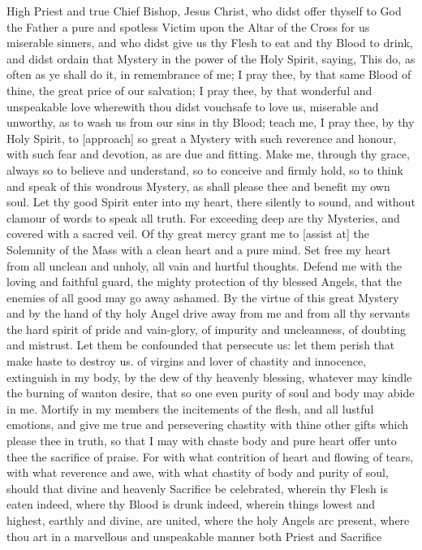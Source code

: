  High Priest and true Chief Bishop, Jesus Christ, who didst offer thyself to God the Father a pure and spotless Victim upon the Altar of the Cross for us miserable sinners, and who didst give us thy Flesh to eat and thy Blood to drink, and didst ordain that Mystery in the power of the Holy Spirit, saying, This do, as often as ye shall do it, in remembrance of me; I pray thee, by that same Blood of thine, the great price of our salvation; I pray thee, by that wonderful and unspeakable love wherewith thou didst vouchsafe to love us, miserable and unworthy, as to wash us from our sins in thy Blood; teach me, I pray thee, by thy Holy Spirit, to [approach] so great a Mystery with such reverence and honour, with such fear and devotion, as are due and fitting. Make me, through thy grace, always so to believe and understand, so to conceive and firmly hold, so to think and speak of this wondrous Mystery, as shall please thee and benefit my own soul. Let thy good Spirit enter into my heart, there silently to sound, and without clamour of words to speak all truth. For exceeding deep are thy Mysteries, and covered with a sacred veil. Of thy great mercy grant me to [assist at] the Solemnity of the Mass with a clean heart and a pure mind. Set free my heart from all unclean and unholy, all vain and hurtful thoughts. Defend me with the loving and faithful guard, the mighty protection of thy blessed Angels, that the enemies of all good may go away ashamed. By the virtue of this great Mystery and by the hand of thy holy Angel drive away from me and from all thy servants the hard spirit of pride and vain-glory, of impurity and uncleanness, of doubting and mistrust. Let them be confounded that persecute us: let them perish that make haste to destroy us. 
 of virgins and lover of chastity and innocence, extinguish in my body, by the dew of thy heavenly blessing, whatever may kindle the burning of wanton desire, that so one even purity of soul and body may abide in me. Mortify in my members the incitements of the flesh, and all lustful emotions, and give me true and persevering chastity with thine other gifts which please thee in truth, so that I may with chaste body and pure heart offer unto thee the sacrifice of praise. For with what contrition of heart and flowing of tears, with what reverence and awe, with what chastity of body and purity of soul, should that divine and heavenly Sacrifice be celebrated, wherein thy Flesh is eaten indeed, where thy Blood is drunk indeed, wherein things lowest and highest, earthly and divine, are united, where the holy Angels arc present, where thou art in a marvellous and unspeakable manner both Priest and Sacrifice 
